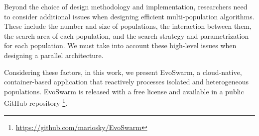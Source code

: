 \documentclass[review]{elsarticle}
\begin{document}
Beyond the choice of design methodology and implementation, researchers need to
consider additional issues \cite{Ma2019} when designing efficient multi-population algorithms. 
These include the number and size of populations,
the interaction between them, the search area of each population, and the search
strategy and parametrization for each population. We must take into account
these high-level issues when designing a parallel architecture.

Considering these factors, in this work, we present EvoSwarm, 
a cloud-native, container-based application that reactively processes
isolated and heterogeneous populations. 
EvoSwarm is released with a free license
and available in a public 
GitHub repository
\footnote{\url{https://github.com/mariosky/EvoSwarm}}.



\end{document}
